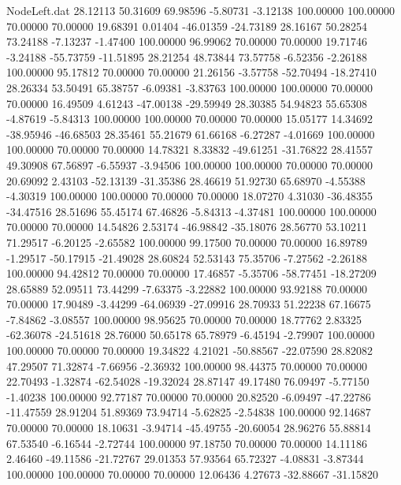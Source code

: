 \begin{filecontents}{NodeLeft.dat}
  28.12113   50.31609   69.98596    -5.80731   -3.12138  100.00000  100.00000   70.00000   70.00000   19.68391    0.01404  -46.01359  -24.73189
  28.16167   50.28254   73.24188    -7.13237   -1.47400  100.00000   96.99062   70.00000   70.00000   19.71746   -3.24188  -55.73759  -11.51895
  28.21254   48.73844   73.57758    -6.52356   -2.26188  100.00000   95.17812   70.00000   70.00000   21.26156   -3.57758  -52.70494  -18.27410
  28.26334   53.50491   65.38757    -6.09381   -3.83763  100.00000  100.00000   70.00000   70.00000   16.49509    4.61243  -47.00138  -29.59949
  28.30385   54.94823   55.65308    -4.87619   -5.84313  100.00000  100.00000   70.00000   70.00000   15.05177   14.34692  -38.95946  -46.68503
  28.35461   55.21679   61.66168    -6.27287   -4.01669  100.00000  100.00000   70.00000   70.00000   14.78321    8.33832  -49.61251  -31.76822
  28.41557   49.30908   67.56897    -6.55937   -3.94506  100.00000  100.00000   70.00000   70.00000   20.69092    2.43103  -52.13139  -31.35386
  28.46619   51.92730   65.68970    -4.55388   -4.30319  100.00000  100.00000   70.00000   70.00000   18.07270    4.31030  -36.48355  -34.47516
  28.51696   55.45174   67.46826    -5.84313   -4.37481  100.00000  100.00000   70.00000   70.00000   14.54826    2.53174  -46.98842  -35.18076
  28.56770   53.10211   71.29517    -6.20125   -2.65582  100.00000   99.17500   70.00000   70.00000   16.89789   -1.29517  -50.17915  -21.49028
  28.60824   52.53143   75.35706    -7.27562   -2.26188  100.00000   94.42812   70.00000   70.00000   17.46857   -5.35706  -58.77451  -18.27209
  28.65889   52.09511   73.44299    -7.63375   -3.22882  100.00000   93.92188   70.00000   70.00000   17.90489   -3.44299  -64.06939  -27.09916
  28.70933   51.22238   67.16675    -7.84862   -3.08557  100.00000   98.95625   70.00000   70.00000   18.77762    2.83325  -62.36078  -24.51618
  28.76000   50.65178   65.78979    -6.45194   -2.79907  100.00000  100.00000   70.00000   70.00000   19.34822    4.21021  -50.88567  -22.07590
  28.82082   47.29507   71.32874    -7.66956   -2.36932  100.00000   98.44375   70.00000   70.00000   22.70493   -1.32874  -62.54028  -19.32024
  28.87147   49.17480   76.09497    -5.77150   -1.40238  100.00000   92.77187   70.00000   70.00000   20.82520   -6.09497  -47.22786  -11.47559
  28.91204   51.89369   73.94714    -5.62825   -2.54838  100.00000   92.14687   70.00000   70.00000   18.10631   -3.94714  -45.49755  -20.60054
  28.96276   55.88814   67.53540    -6.16544   -2.72744  100.00000   97.18750   70.00000   70.00000   14.11186    2.46460  -49.11586  -21.72767
  29.01353   57.93564   65.72327    -4.08831   -3.87344  100.00000  100.00000   70.00000   70.00000   12.06436    4.27673  -32.88667  -31.15820

\end{filecontents}
